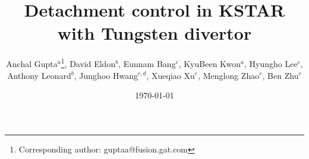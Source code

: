 \documentclass[10pt]{iopart}
\begin{document}
\title{Detachment control in KSTAR with Tungsten divertor}

\author{
    Anchal Gupta$^a$\footnote{Corresponding author: guptaa@fusion.gat.com},
    David Eldon$^b$, 
    Eunnam Bang$^c$, 
    KyuBeen Kwon$^a$, 
    Hyungho Lee$^c$, 
    Anthony Leonard$^b$, 
    Junghoo Hwang$^{c, d}$, 
    Xueqiao Xu$^e$, 
    Menglong Zhao$^e$, 
    Ben Zhu$^e$
}

\address{$^a$\ORAU}
\address{$^b$\GA}
\address{$^c$\KFE}
\address{$^d$\KAIST}
\address{$^e$\LLNL}

\date{\today}



\submitto{\PPCF}

\maketitle

\ioptwocol

\acresetall  %




















\end{document}
